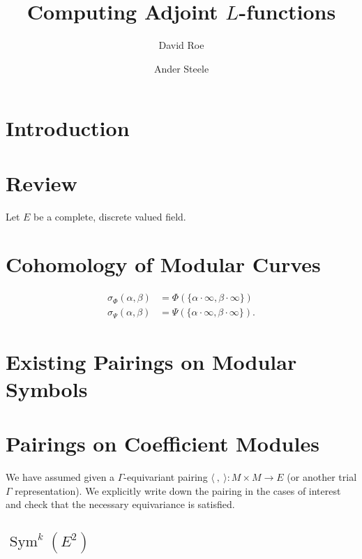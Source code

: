 \documentclass[10pt]{amsart}
\title{Computing Adjoint $L$-functions}
\author{David Roe}
\author{Ander Steele}
\theoremstyle{plain}
\theoremstyle{definition}
\DeclareMathOperator{\Sym}{Sym}
\begin{document}
\maketitle

\section{Introduction}

\section{Review}

Let $E$ be a complete, discrete valued field.  

\section{Cohomology of Modular Curves} \label{sec:mod_curve_cohom}
\begin{align*}
\sigma_{\Phi}(\alpha, \beta) &= \Phi(\{\alpha \cdot \infty, \beta \cdot \infty\}) \\
\sigma_{\Psi}(\alpha, \beta) &= \Psi(\{\alpha \cdot \infty, \beta \cdot \infty\}).
\end{align*}

\section{Existing Pairings on Modular Symbols} \label{sec:existing_pairings}

\section{Pairings on Coefficient Modules} \label{sec:coeff_pairing}

We have assumed given a $\Gamma$-equivariant pairing $\langle~,~ \rangle : M \times M \longrightarrow E$ (or another trial $\Gamma$ representation). We explicitly write down the pairing in the cases of interest and check that the necessary equivariance is satisfied. 

\subsection{$\Sym^k(E^2)$}
\end{document}

